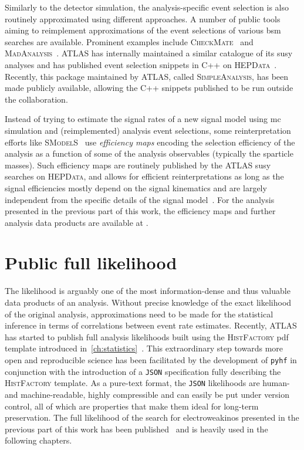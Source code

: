 Similarly to the detector simulation, the analysis-specific event selection is also routinely approximated using different approaches. A number of public tools aiming to reimplement approximations of the event selections of various \gls{bsm} searches are available. Prominent examples include \textsc{CheckMate}~\cite{Checkmate2:2016npn,Checkmate:2013wra} and \textsc{MadAnalysis}~\cite{MadAnalysis:2012fm}. ATLAS has internally maintained a similar catalogue of its \gls{susy} analyses and has published event selection snippets in C++ on \textsc{HEPData}~\cite{HEPData:2017ypu}. Recently, this package maintained by ATLAS, called \textsc{SimpleAnalysis}, has been made publicly available, allowing the C++ snippets published to be run outside the collaboration.

Instead of trying to estimate the signal rates of a new signal model using \gls{mc} simulation and (reimplemented) analysis event selections, some reinterpretation efforts like \eg \textsc{SModelS}~\cite{SModelS1:2013mwa,SModelS2:2017neo} use \textit{efficiency maps} encoding the selection efficiency of the analysis as a function of some of the analysis observables (typically the sparticle masses). Such efficiency maps are routinely published by the ATLAS \gls{susy} searches on \textsc{HEPData}, and allows for efficient reinterpretations as long as the signal efficiencies mostly depend on the signal kinematics and are largely independent from the specific details of the signal model~\cite{SModelS1:2013mwa}. For the analysis presented in the previous part of this work, the efficiency maps and further analysis data products are available at \cite{HEPdata_1Lbb}. 

\section{Public full likelihood}\label{sec:full_likelihood}

The likelihood is arguably one of the most information-dense and thus valuable data products of an analysis. Without precise knowledge of the exact likelihood of the original analysis, approximations need to be made for the statistical inference \eg in terms of correlations between event rate estimates. Recently, ATLAS has started to publish full analysis likelihoods built using the \textsc{HistFactory} \gls{pdf} template introduced in~\cref{ch:statistics}~\cite{ATL-PHYS-PUB-2019-029}. This extraordinary step towards more open and reproducible science has been facilitated by the development of \texttt{pyhf} in conjunction with the introduction of a \texttt{JSON} specification fully describing the \textsc{HistFactory} template. As a pure-text format, the \texttt{JSON} likelihoods are human- and machine-readable, highly compressible and can easily be put under version control, all of which are properties that make them ideal for long-term preservation. The full likelihood of the search for electroweakinos presented in the previous part of this work has been published~\cite{fullLH_1Lbb} and is heavily used in the following chapters.

